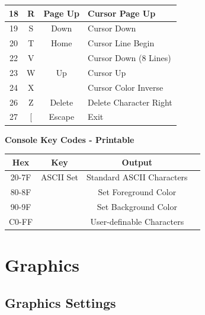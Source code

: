 \documentclass[12pt]{article}
\begin{document}
\begin{table}[h]
\begin{tabular}{ | c | c | c | l | }
18             & R                 & Page Up      & Cursor Page Up                \\ \hline
19             & S                 & Down         & Cursor Down                   \\ \hline
20             & T                 & Home         & Cursor Line Begin             \\ \hline
22             & V                 &              & Cursor Down (8 Lines)         \\ \hline
23             & W                 & Up           & Cursor Up                     \\ \hline
24             & X                 &              & Cursor Color Inverse          \\ \hline
26             & Z                 & Delete       & Delete Character Right        \\ \hline
27             & [                 & Escape       & Exit                          \\ \hline
\end{tabular}
\end{table}

\begin{table}[h]
\centering\textbf{Console Key Codes - Printable}        \\
\begin{tabular}{ | c | c | c | l | }                       \hline
\textbf{Hex} & \textbf{Key} & \textbf{Output}           \\ \hline
20-7F        & ASCII Set    & Standard ASCII Characters \\ \hline
80-8F        &              & Set Foreground Color      \\ \hline
90-9F        &              & Set Background Color      \\ \hline
C0-FF        &              & User-definable Characters \\ \hline
\end{tabular}
\end{table}


\pagebreak


\section{Graphics}\label{graphics}

\subsection{Graphics Settings}\label{subsec:graphics-settings}
\end{document}
